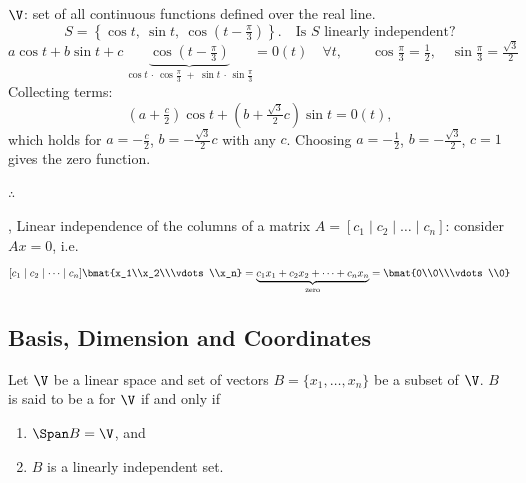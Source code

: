 \begin{example}
$\V$: set of all continuous functions defined over the real line.
\[ S = \left\{ \cos t,\ \sin t,\ \cos\!\left(t-\tfrac{\pi}{3}\right) \right\}. \quad \text{Is $S$ linearly independent?} \]
\[
a\cos t+b\sin t+c\,
\underbrace{\cos\!\left(t-\tfrac{\pi}{3}\right)}_{\cos t\,\cdot\,\cos\frac{\pi}{3}\;+\;\sin t\,\cdot\,\sin\frac{\pi}{3}} = 0(t)\quad \forall t,
\qquad \cos\tfrac{\pi}{3} = \tfrac12,\quad \sin\tfrac{\pi}{3} = \tfrac{\sqrt3}{2}
\]
Collecting terms:
\[ \left(a+\tfrac{c}{2}\right)\cos t+\left(b+\tfrac{\sqrt3}{2}c\right)\sin t = 0(t), \]
which holds for $a=-\tfrac{c}{2}$, $b=-\tfrac{\sqrt3}{2}c$ with any $c$. Choosing $a=-\tfrac12$, $b=-\tfrac{\sqrt3}{2}$, $c=1$ gives the zero function.

$\therefore$ 
\end{example}

\sep
Linear independence of the columns of a matrix $A = [c_1 \mid c_2 \mid \dots \mid c_n]$: consider $Ax=0$, i.e.
\[
[c_1 \mid c_2 \mid \dots \mid c_n]\bmat{x_1\\x_2\\\vdots\\x_n}
= \underbrace{c_1x_1+c_2x_2+\dots+c_nx_n}_{\text{zero}} = \bmat{0\\0\\\vdots\\0}
\]

\subsection{Basis, Dimension and Coordinates}\label{ss:basis}
\begin{definition}
Let $\V$ be a linear space and set of vectors $B=\{x_1,\dots,x_n\}$ be a subset of $\V$. $B$ is said to be a  for $\V$ if and only if
\begin{enumerate}[label=(\roman*)]
\item $\Span B=\V$, and
\item $B$ is a linearly independent set.
\end{enumerate}
\end{definition}

